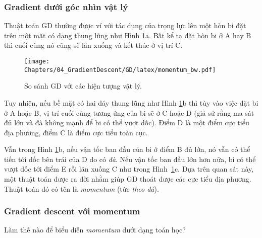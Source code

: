  
\subsubsection{Gradient dưới góc nhìn vật lý }
 
Thuật toán GD thường được ví với tác dụng của trọng lực lên một hòn bi đặt trên
một mặt có dạng thung lũng như Hình \ref{fig:8_1}a. Bất kể ta đặt hòn bi ở A
hay B thì cuối cùng nó cũng sẽ lăn xuống và kết thúc ở vị trí C.
 
\begin{figure}[t]
\centering
    \texttt{[image: Chapters/04\_GradientDescent/GD/latex/momentum\_bw.pdf]}
    \caption[]{So sánh GD với các hiện tượng vật lý.}
    \label{fig:8_1}
\end{figure}
Tuy nhiên, nếu bề mặt có hai đáy thung lũng như Hình \ref{fig:8_1}b thì tùy
vào việc đặt bi ở A hoặc B, vị trí cuối cùng tương ứng của bi sẽ ở C hoặc D (giả
sử rằng ma sát đủ lớn và đà không mạnh để bi có thể vượt dốc). Điểm D
là một điểm cực tiểu địa phương, điểm C là điểm cực tiểu toàn cục. 

Vẫn trong Hình \ref{fig:8_1}b, nếu vận tốc ban đầu của bi ở điểm B đủ lớn, nó
vẫn có thể tiến tới dốc bên trái của D do có \textit{đà}. Nếu vận tốc
ban đầu lớn hơn nữa, bi có thể vượt dốc tới điểm E rồi lăn xuống C như trong
Hình~\ref{fig:8_1}c. Dựa trên quan sát này, một thuật toán được ra đời nhằm giúp
GD thoát được các cực tiểu địa phương. Thuật toán đó có tên là \textit{momentum}
(tức \textit{theo đà}).
 
\subsubsection{Gradient descent với momentum}
Làm thế nào để biểu diễn \textit{momentum} dưới dạng toán học?
 

